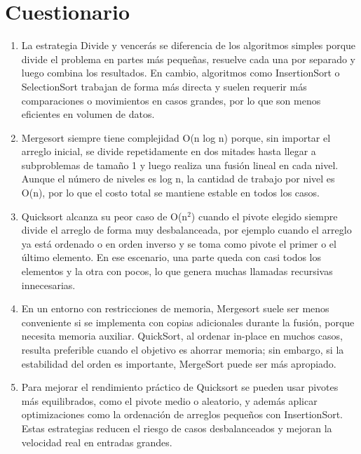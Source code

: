 \documentclass{article}
\begin{document}
	\section{Cuestionario}

        \begin{enumerate}
            \item La estrategia Divide y vencerás se diferencia de los algoritmos simples porque divide el problema en partes más pequeñas, resuelve cada una por separado y luego combina los resultados. En cambio, algoritmos como InsertionSort o SelectionSort trabajan de forma más directa y suelen requerir más comparaciones o movimientos en casos grandes, por lo que son menos eficientes en volumen de datos.

            \item Mergesort siempre tiene complejidad O(n log n) porque, sin importar el arreglo inicial, se divide repetidamente en dos mitades hasta llegar a subproblemas de tamaño 1 y luego realiza una fusión lineal en cada nivel. Aunque el número de niveles es log n, la cantidad de trabajo por nivel es O(n), por lo que el costo total se mantiene estable en todos los casos.

            \item Quicksort alcanza su peor caso de O(n$^2$) cuando el pivote elegido siempre divide el arreglo de forma muy desbalanceada, por ejemplo cuando el arreglo ya está ordenado o en orden inverso y se toma como pivote el primer o el último elemento. En ese escenario, una parte queda con casi todos los elementos y la otra con pocos, lo que genera muchas llamadas recursivas innecesarias.

            \item En un entorno con restricciones de memoria, Mergesort suele ser menos conveniente si se implementa con copias adicionales durante la fusión, porque necesita memoria auxiliar. QuickSort, al ordenar in-place en muchos casos, resulta preferible cuando el objetivo es ahorrar memoria; sin embargo, si la estabilidad del orden es importante, MergeSort puede ser más apropiado.

            \item Para mejorar el rendimiento práctico de Quicksort se pueden usar pivotes más equilibrados, como el pivote medio o aleatorio, y además aplicar optimizaciones como la ordenación de arreglos pequeños con InsertionSort. Estas estrategias reducen el riesgo de casos desbalanceados y mejoran la velocidad real en entradas grandes.
        \end{enumerate}
\end{document}
